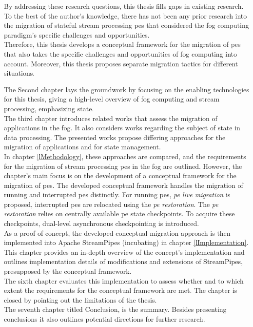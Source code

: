 By addressing these research questions, this thesis fills gaps in existing research. To the best of the author's knowledge, there has not been any prior research into the migration of stateful stream processing \gls{pe}s that considered the fog computing paradigm's specific challenges and opportunities.\\
Therefore, this thesis develops a conceptual framework for the migration of \gls{pe}s that also takes the specific challenges and opportunities of fog computing into account. Moreover, this thesis proposes separate migration tactics for different situations.\par

The Second chapter lays the groundwork by focusing on the enabling technologies for this thesis, giving a high-level overview of fog computing and stream processing, emphasizing state.\\
The third chapter introduces related works that assess the migration of applications in the fog. It also considers works regarding the subject of state in data processing. The presented works propose differing approaches for the migration of applications and for state management.\\
In chapter \ref{lMethodology}, these approaches are compared, and the requirements for the migration of stream processing \gls{pe}s in the fog are outlined. However, the chapter's main focus is on the development of a conceptual framework for the migration of \gls{pe}s. The developed conceptual framework handles the migration of running and interrupted \gls{pe}s distinctly. For running \gls{pe}s, \textit{\acrshort{pe} live migration} is proposed, interrupted \gls{pe}s are relocated using the \textit{\acrshort{pe} restoration}. The \textit{\acrshort{pe} restoration} relies on centrally available \gls{pe} state checkpoints. To acquire these checkpoints, dual-level asynchronous checkpointing is introduced.\\
As a proof of concept, the developed conceptual migration approach is then implemented into Apache StreamPipes (incubating) in chapter \ref{lImplementation}. This chapter provides an in-depth overview of the concept's implementation and outlines implementation details of modifications and extensions of StreamPipes, presupposed by the conceptual framework.\\
The sixth chapter evaluates this implementation to assess whether and to which extent the requirements
for the conceptual framework are met. The chapter is closed by pointing out the limitations of the thesis.\\
The seventh chapter titled Conclusion, is the summary. Besides presenting conclusions it also outlines potential directions for further research.
